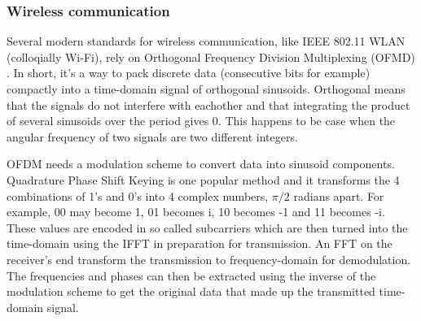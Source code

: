 \subsubsection{Wireless communication}
Several modern standards for wireless communication, like IEEE 802.11 WLAN (colloqially Wi-Fi), rely on Orthogonal Frequency Division Multiplexing (OFMD) . In short, it's a way to pack discrete data (consecutive bits for example) compactly into a time-domain signal of orthogonal sinusoids. Orthogonal means that the signals do not interfere with eachother and that integrating the product of several sinusoids over the period gives 0. This happens to be case when the angular frequency of two signals are two different integers. 

OFDM needs a modulation scheme to convert data into sinusoid components. Quadrature Phase Shift Keying is one popular method and it transforms the 4 combinations of 1's and 0's into 4 complex numbers, $\pi/2$ radians apart. For example, 00 may become 1, 01 becomes i, 10 becomes -1 and 11 becomes -i. These values are encoded in so called subcarriers which are then turned into the time-domain using the IFFT in preparation for transmission. An FFT on the receiver's end transform the transmission to frequency-domain for demodulation. The frequencies and phases can then be extracted using the inverse of the modulation scheme to get the original data that made up the transmitted time-domain signal.




